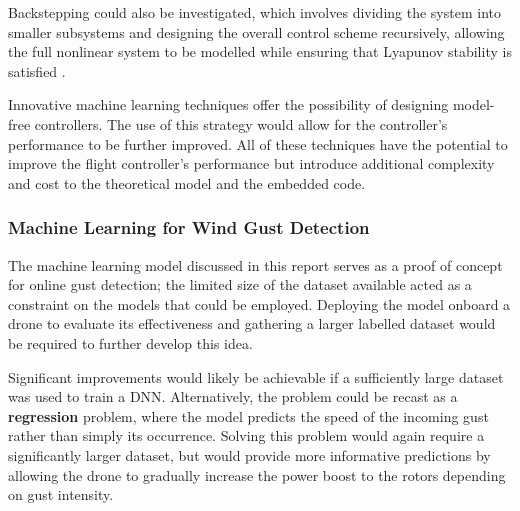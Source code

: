 Backstepping could also be investigated, which involves dividing the system into smaller subsystems and designing the overall control scheme recursively, allowing the full nonlinear system to be modelled while ensuring that Lyapunov stability is satisfied \cite{4058900}. 

Innovative machine learning techniques offer the possibility of designing model-free controllers. The use of this strategy would allow for the controller's performance to be further improved. All of these techniques have the potential to improve the flight controller's performance but introduce additional complexity and cost to the theoretical model and the embedded code.

\subsubsection{Machine Learning for Wind Gust Detection}

The machine learning model discussed in this report serves as a proof of concept for online gust detection; the limited size of the dataset available acted as a constraint on the models that could be employed. Deploying the model onboard a drone to evaluate its effectiveness and gathering a larger labelled dataset would be required to further develop this idea. 

Significant improvements would likely be achievable if a sufficiently large dataset was used to train a \gls{DNN}. Alternatively, the problem could be recast as a \textbf{regression} problem, where the model predicts the speed of the incoming gust rather than simply its occurrence. Solving this problem would again require a significantly larger dataset, but would provide more informative predictions by allowing the drone to gradually increase the power boost to the rotors depending on gust intensity.



